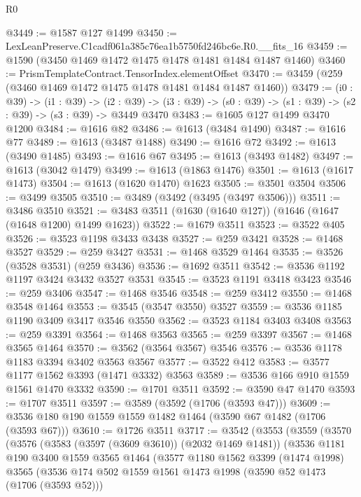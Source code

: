 \begin{lexlean}{R0}
\begin{coremodule}
@3449 := @1587 @127 @1499
@3450 := LexLeanPreserve.C1cadf061a385c76ea1b5750fd246bc6e.R0.__fits_16
@3459 := @1590 (@3450 @1469 @1472 @1475 @1478 @1481 @1484 @1487 @1460)
@3460 := PrismTemplateContract.TensorIndex.elementOffset
@3470 := @3459 (@259 (@3460 @1469 @1472 @1475 @1478 @1481 @1484 @1487 @1460))
@3479 := (i0 : @39) ->
  (i1 : @39) ->
  (i2 : @39) -> (i3 : @39) -> (s0 : @39) -> (s1 : @39) -> (s2 : @39) -> (s3 : @39) -> @3449 @3470
@3483 := @1605 @127 @1499 @3470 @1200
@3484 := @1616 @82
@3486 := @1613 (@3484 @1490)
@3487 := @1616 @77
@3489 := @1613 (@3487 @1488)
@3490 := @1616 @72
@3492 := @1613 (@3490 @1485)
@3493 := @1616 @67
@3495 := @1613 (@3493 @1482)
@3497 := @1613 (@3042 @1479)
@3499 := @1613 (@1863 @1476)
@3501 := @1613 (@1617 @1473)
@3504 := @1613 (@1620 @1470) @1623
@3505 := @3501 @3504
@3506 := @3499 @3505
@3510 := @3489 (@3492 (@3495 (@3497 @3506)))
@3511 := @3486 @3510
@3521 := @3483 @3511 (@1630 (@1640 @127)) (@1646 (@1647 (@1648 @1200) @1499 @1623))
@3522 := @1679 @3511
@3523 := @3522 @405
@3526 := @3523 @1198 @3433 @3438
@3527 := @259 @3421
@3528 := @1468 @3527
@3529 := @259 @3427
@3531 := @1468 @3529 @1464
@3535 := @3526 (@3528 @3531) (@259 @3436)
@3536 := @1692 @3511
@3542 := @3536 @1192 @1197 @3424 @3432 @3527 @3531
@3545 := @3523 @1191 @3418 @3423
@3546 := @259 @3406
@3547 := @1468 @3546
@3548 := @259 @3412
@3550 := @1468 @3548 @1464
@3553 := @3545 (@3547 @3550) @3527
@3559 := @3536 @1185 @1190 @3409 @3417 @3546 @3550
@3562 := @3523 @1184 @3403 @3408
@3563 := @259 @3391
@3564 := @1468 @3563
@3565 := @259 @3397
@3567 := @1468 @3565 @1464
@3570 := @3562 (@3564 @3567) @3546
@3576 := @3536 @1178 @1183 @3394 @3402 @3563 @3567
@3577 := @3522 @412
@3583 := @3577 @1177 @1562 @3393 (@1471 @3332) @3563
@3589 := @3536 @166 @910 @1559 @1561 @1470 @3332
@3590 := @1701 @3511
@3592 := @3590 @47 @1470
@3593 := @1707 @3511
@3597 := @3589 (@3592 (@1706 (@3593 @47)))
@3609 := @3536 @180 @190 @1559 @1559 @1482 @1464 (@3590 @67 @1482 (@1706 (@3593 @67)))
@3610 := @1726 @3511
@3717 := @3542
    (@3553
      (@3559
        (@3570
          (@3576
            (@3583 (@3597 (@3609 @3610)) (@2032 @1469 @1481))
            (@3536
              @1181
              @190
              @3400
              @1559
              @3565
              @1464
              (@3577
                @1180
                @1562
                @3399
                (@1474 @1998)
                @3565
                (@3536
                  @174
                  @502
                  @1559
                  @1561
                  @1473
                  @1998
                  (@3590 @52 @1473 (@1706 (@3593 @52)))

\end{coremodule}
\end{lexlean}
